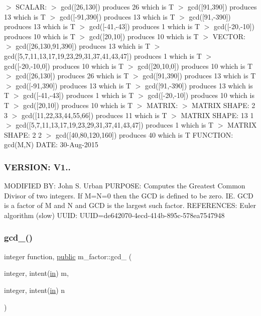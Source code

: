 $>$ S\+C\+A\+L\+AR\+: $>$ gcd(\mbox{[}26,130\mbox{]}) produces 26 which is T $>$ gcd(\mbox{[}91,390\mbox{]}) produces 13 which is T $>$ gcd(\mbox{[}-\/91,390\mbox{]}) produces 13 which is T $>$ gcd(\mbox{[}91,-\/390\mbox{]}) produces 13 which is T $>$ gcd(\mbox{[}-\/41,-\/43\mbox{]}) produces 1 which is T $>$ gcd(\mbox{[}-\/20,-\/10\mbox{]}) produces 10 which is T $>$ gcd(\mbox{[}20,10\mbox{]}) produces 10 which is T $>$ V\+E\+C\+T\+OR\+: $>$ gcd(\mbox{[}26,130,91,390\mbox{]}) produces 13 which is T $>$ gcd(\mbox{[}5,7,11,13,17,19,23,29,31,37,41,43,47\mbox{]}) produces 1 which is T $>$ gcd(\mbox{[}-\/20,-\/10,0\mbox{]}) produces 10 which is T $>$ gcd(\mbox{[}20,10,0\mbox{]}) produces 10 which is T $>$ gcd(\mbox{[}26,130\mbox{]}) produces 26 which is T $>$ gcd(\mbox{[}91,390\mbox{]}) produces 13 which is T $>$ gcd(\mbox{[}-\/91,390\mbox{]}) produces 13 which is T $>$ gcd(\mbox{[}91,-\/390\mbox{]}) produces 13 which is T $>$ gcd(\mbox{[}-\/41,-\/43\mbox{]}) produces 1 which is T $>$ gcd(\mbox{[}-\/20,-\/10\mbox{]}) produces 10 which is T $>$ gcd(\mbox{[}20,10\mbox{]}) produces 10 which is T $>$ M\+A\+T\+R\+IX\+: $>$ M\+A\+T\+R\+IX S\+H\+A\+PE\+: 2 3 $>$ gcd(\mbox{[}11,22,33,44,55,66\mbox{]}) produces 11 which is T $>$ M\+A\+T\+R\+IX S\+H\+A\+PE\+: 13 1 $>$ gcd(\mbox{[}5,7,11,13,17,19,23,29,31,37,41,43,47\mbox{]}) produces 1 which is T $>$ M\+A\+T\+R\+IX S\+H\+A\+PE\+: 2 2 $>$ gcd(\mbox{[}40,80,120,160\mbox{]}) produces 40 which is T F\+U\+N\+C\+T\+I\+ON\+: gcd(\+M,\+N) D\+A\+TE\+: 30-\/\+Aug-\/2015 \subsubsection*{V\+E\+R\+S\+I\+ON\+: V1..}

M\+O\+D\+I\+F\+I\+ED BY\+: John S. Urban P\+U\+R\+P\+O\+SE\+: Computes the Greatest Common Divisor of two integers. If M=N=0 then the G\+CD is defined to be zero. IE. G\+CD is a factor of M and N and G\+CD is the largest such factor. R\+E\+F\+E\+R\+E\+N\+C\+ES\+: Euler algorithm (slow) U\+U\+ID\+: U\+U\+ID=de642070-\/4ecd-\/414b-\/895c-\/578ea7547948 \mbox{\label{namespacem__factor_aed74f995a7c71e8cec13964b82457403}} 
\subsubsection{\texorpdfstring{gcd\+\_()}{gcd\_2()}}
{\footnotesize\ttfamily integer function, \hyperlink{M__stopwatch_83_8txt_a2f74811300c361e53b430611a7d1769f}{public} m\+\_\+factor\+::gcd\+\_ (\begin{DoxyParamCaption}\item[{integer, intent(\hyperlink{M__journal_83_8txt_afce72651d1eed785a2132bee863b2f38}{in})}]{m,  }\item[{integer, intent(\hyperlink{M__journal_83_8txt_afce72651d1eed785a2132bee863b2f38}{in})}]{n }\end{DoxyParamCaption})}

